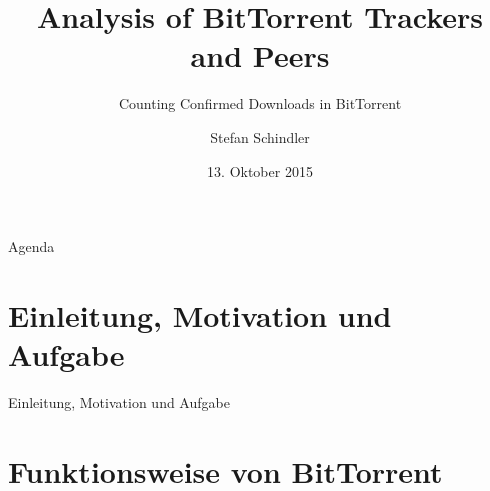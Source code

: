 \documentclass[dvipsnames]{beamer} %
\title[BitTorrent-Downloads]{Analysis of BitTorrent Trackers and Peers}
\subtitle{Counting Confirmed Downloads in BitTorrent}
\author{Stefan Schindler}
\institute[FAU]{Friedrich-Alexander-Universität Erlangen-Nürnberg}
\date{13. Oktober 2015}
\begin{document}
	\begin{frame}
		\titlepage
	\end{frame}

	\begin{frame}{Agenda}
		\tableofcontents
	\end{frame}

	\section{Einleitung, Motivation und Aufgabe}
	\begin{frame}{Einleitung, Motivation und Aufgabe}
	\end{frame}

	\section{Funktionsweise von BitTorrent}
\end{document}
